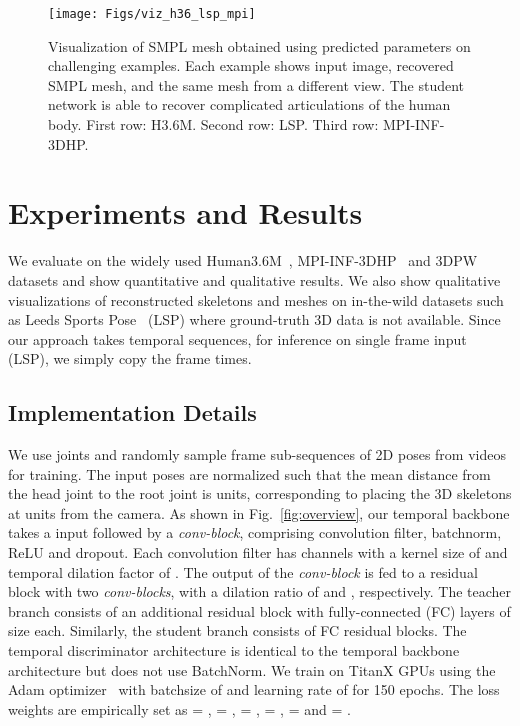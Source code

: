 \documentclass[10pt,twocolumn,letterpaper]{article}
\begin{document}
 


\begin{figure*}[t!]
	\centering
	\texttt{[image: Figs/viz\_h36\_lsp\_mpi]} 
	\vspace{-1ex}
	\caption{Visualization of SMPL mesh obtained using predicted parameters on challenging examples. Each example shows input image, recovered SMPL mesh, and the same mesh from a different view. The student network is able to recover complicated articulations of the human body. First row: H3.6M. Second row: LSP. Third row: MPI-INF-3DHP. }
	\label{fig:h36vis_mesh}
	\vspace{-3ex}
\end{figure*}

\section{Experiments and Results}
\label{section:evaluation}
We evaluate on the widely used Human3.6M~\cite{ionescu2013human3}, MPI-INF-3DHP~\cite{mehta2017monocular} and 3DPW~\cite{vonMarcard2018}  datasets and show quantitative and qualitative results. We also show qualitative visualizations of reconstructed skeletons and meshes on in-the-wild datasets such as Leeds Sports Pose~\cite{johnson2010clustered} (LSP) where ground-truth 3D data is not available. Since our approach takes temporal sequences, for inference on single frame input (\eg LSP), we simply copy the frame  times.
\subsection{Implementation Details}
\label{subsec:implementation}
We use  joints and randomly sample  frame sub-sequences of 2D poses from videos for training. The input poses are normalized such that the mean distance from the head joint to the root joint is  units, corresponding to placing the 3D skeletons at  units from the camera.
As shown in Fig.~\ref{fig:overview}, our temporal backbone takes a  input followed by a \textit{conv-block}, comprising convolution filter, batchnorm, ReLU and dropout. Each convolution filter has  channels with a kernel size of  and temporal dilation factor of .  The output of the \textit{conv-block} is fed to a residual block with two \textit{conv-blocks}, with a dilation ratio of  and , respectively. The teacher branch consists of an additional residual block with  fully-connected (FC) layers of size  each. Similarly, the student branch consists of  FC residual blocks. The temporal discriminator architecture is identical to the temporal backbone architecture but does not use BatchNorm. We train on TitanX GPUs using the Adam optimizer~\cite{kingma2014adam} with batchsize of  and learning rate of  for 150 epochs. The loss weights are empirically set as = , = , = , = , =  and = .
\end{document}
